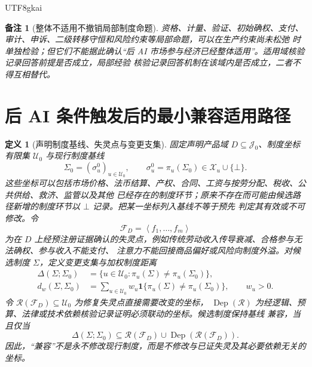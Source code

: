 \documentclass[12pt,a4paper,openany]{report}
\newtheorem{definition}{定义}[chapter]
\newtheorem{remark}{备注}[chapter]
\newcommand{\Goods}{\mathcal J}
\newcommand{\Tuple}[1]{\left\langle #1\right\rangle}
\begin{document}
\begin{CJK*}{UTF8}{gkai}
\begin{remark}[整体不适用不撤销局部制度命题]
资格、计量、验证、初始确权、支付、审计、申诉、二级转移守恒和风险约束等局部命题，可以在生产约束尚未松弛
时单独检验；但它们不能据此确认“后 AI 市场参与经济已经整体适用”。适用域核验记录回答前提是否成立，局部经验
核验记录回答机制在该域内是否成立，二者不得互相替代。
\end{remark}

\section{后 AI 条件触发后的最小兼容适用路径}

\begin{definition}[声明制度基线、失灵点与变更支集]
\label{def:minimal-compatible-baseline}
固定声明产品域 \(D\subseteq\Goods_0\)、制度坐标有限集 \(\mathcal U_0\) 与现行制度基线
\[
  \Sigma_0=(\sigma_u^0)_{u\in\mathcal U_0},
  \qquad
  \sigma_u^0=\pi_u(\Sigma_0)\in\mathcal X_u\cup\{\bot\}.
\]
这些坐标可以包括市场价格、法币结算、产权、合同、工资与按劳分配、税收、公共供给、救济、监管以及其他
已经存在的制度环节；原来不存在而可能由候选路径新增的制度环节以 \(\bot\) 记录。把某一坐标列入基线不等于预先
判定其有效或不可修改。令
\[
  \mathcal F_D
  =\Tuple{f_1,\ldots,f_m}
\]
为在 \(D\) 上经预注册证据确认的失灵点，例如传统劳动收入传导衰减、合格参与无法确权、参与收入不能支付、
注意力不能回接商品偏好或风险向制度外溢。对候选制度 \(\Sigma\)，定义变更支集与加权制度距离
\[
\begin{aligned}
  \Delta(\Sigma;\Sigma_0)
  &=\{u\in\mathcal U_0:\pi_u(\Sigma)\ne\pi_u(\Sigma_0)\},\\
  d_w(\Sigma,\Sigma_0)
  &=\sum_{u\in\mathcal U_0}w_u
  \mathbf 1\{\pi_u(\Sigma)\ne\pi_u(\Sigma_0)\},
  \qquad w_u>0.
\end{aligned}
\]
令 \(\mathcal R(\mathcal F_D)\subseteq\mathcal U_0\) 为修复失灵点直接需要改变的坐标，
\(\operatorname{Dep}(\mathcal R)\) 为经逻辑、预算、法律或技术依赖核验记录证明必须联动的坐标。候选制度保持基线
兼容，当且仅当
\[
  \Delta(\Sigma;\Sigma_0)
  \subseteq
  \mathcal R(\mathcal F_D)\cup
  \operatorname{Dep}(\mathcal R(\mathcal F_D)).
\]
因此，“兼容”不是永不修改现行制度，而是不修改与已证失灵及其必要依赖无关的坐标。
\end{definition}


\end{CJK*}
\end{document}
